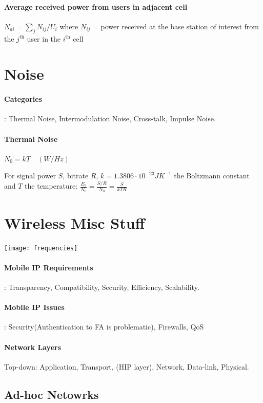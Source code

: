 \documentclass[6pt]{scrartcl}
\begin{document}
\begin{multicols}{4}
\paragraph{Average received power from users in adjacent cell}
$N_{ai} = \sum_j N_{ij}/U_i$ where $N_{ij}$ = power received at the base station of interest from the $j^\text{th}$ user in the $i^\text{th}$ cell

\section{Noise}
\paragraph{Categories}: Thermal Noise, Intermodulation Noise, Cross-talk, Impulse Noise.
\paragraph{Thermal Noise}$N_0 = kT\quad(W/Hz)$

For signal power $S$, bitrate $R$, $k = 1.3806\cdot10^{-23} JK^{-1}$ the Boltzmann constant and $T$ the temperature: $\frac{E_b}{N_0} = \frac{S/R}{N_0} = \frac{S}{kTR}$

\section{Wireless Misc Stuff}
\texttt{[image: frequencies]}

\paragraph{Mobile IP Requirements}:
Transparency, Compatibility, Security, Efficiency, Scalability.

\paragraph{Mobile IP Issues}: Security(Authentication to FA is problematic), Firewalls, QoS

\paragraph{Network Layers} Top-down: Application, Transport, (HIP layer), Network, Data-link, Physical.

\subsection{Ad-hoc Netowrks} %

\end{multicols}
\end{document}

